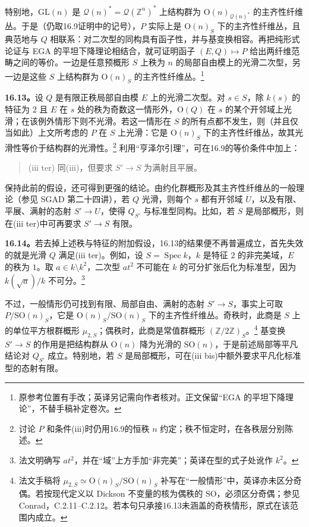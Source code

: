 \documentclass[openany,fontset=fandol]{ctexbook}
\newcommand{\Qsp}{\mathcal Q}
\DeclareMathOperator{\Spec}{Spec}
\begin{document}
特别地，$\mathrm{GL}(n)$ 是 $\Qsp(n)^*=\Qsp(\mathbb Z^n)^*$ 上结构群为 $\mathrm O(n)_{\Qsp(n)^*}$ 的主齐性纤维丛。于是（仍取16.9证明中的记号），$P$ 实际上是 $\mathrm O(n)_S$ 下的主齐性纤维丛，且典范地与 $Q$ 相联系：对二次型的同构具有函子性，并与基变换相容。再把纯形式论证与 EGA 的平坦下降理论相结合，就可证明函子 $(E,Q)\mapsto P$ 给出两纤维范畴之间的等价。一边是任意预概形 $S$ 上秩为 $n$ 的局部自由模上的光滑二次型，另一边是这些 $S$ 上结构群为 $\mathrm O(n)_S$ 的主齐性纤维丛。\footnote{原参考位置有手改；英译另记需向作者核对。正文保留“EGA 的平坦下降理论”，不替手稿补定卷次。}

\medskip
\noindent\textbf{16.13。}\quad 设 $Q$ 是有限正秩局部自由模 $E$ 上的光滑二次型。对 $s\in S$，除 $k(s)$ 的特征为 $2$ 且 $E$ 在 $s$ 处的秩为奇数这一情形外，$\mathrm O(Q)$ 在 $s$ 的某个开邻域上光滑；在该例外情形下则不光滑。若这一情形在 $S$ 的所有点都不发生，则（并且仅当如此）上文所考虑的 $P$ 在 $S$ 上光滑：它是 $\mathrm O(n)_S$ 下的主齐性纤维丛，故其光滑性等价于结构群的光滑性。\footnote{讨论 $P$ 和条件(iii)时仍用16.9的恒秩 $n$ 约定；秩不恒定时，在各秩层分别陈述。}
利用“亨泽尔引理”，可在16.9的等价条件中加上：
\begin{quote}
\textup{(iii ter)} 同(iii)，但要求 $S'\to S$ 为满射且平展。
\end{quote}

保持此前的假设，还可得到更强的结论。由约化群概形及其主齐性纤维丛的一般理论（参见 SGAD 第二十四讲），若 $Q$ 光滑，则每个 $s$ 都有开邻域 $U$，以及有限、平展、满射的态射 $S'\to U$，使得 $Q_{S'}$ 与标准型同构。比如，若 $S$ 是局部概形，则在(iii ter)中可再要求 $S'\to S$ 有限。

\medskip
\newpage
\noindent\textbf{16.14。}\quad 若去掉上述秩与特征的附加假设，16.13的结果便不再普遍成立，首先失效的就是光滑 $Q$ 满足(iii ter)。例如，设 $S=\Spec k$，$k$ 是特征 $2$ 的非完美域，$E$ 的秩为 $1$。取 $a\in k\setminus k^2$，二次型 $at^2$ 不可能在 $k$ 的可分扩张后化为标准型，因为 $k(\sqrt a)/k$ 不可分。\footnote{法文明确写 $at^2$，并在“域”上方手加“非完美”；英译在型的式子处讹作 $k^2$。}

不过，一般情形仍可找到有限、局部自由、满射的态射 $S'\to S$，事实上可取 $P/\mathrm{SO}(n)_S$，它是 $\mathrm O(n)_S/\mathrm{SO}(n)_S$ 下的主齐性纤维丛。奇秩时，此商是 $S$ 上的单位平方根群概形 $\mu_{2,S}$；偶秩时，此商是常值群概形 $(\mathbb Z/2\mathbb Z)_S$。\footnote{法文手稿将 $\mu_{2,S}\simeq\mathrm O(n)_S/\mathrm{SO}(n)_S$ 补写在“一般情形”中，英译亦未区分奇偶。若按现代定义以 Dickson 不变量的核为偶秩的 $\mathrm{SO}$，必须区分奇偶；参见 Conrad，C.2.11--C.2.12。若本句只承接16.13未涵盖的奇秩情形，原式在该范围内成立。}
基变换 $S'\to S$ 的作用是把结构群从 $\mathrm O(n)$ 降为光滑的 $\mathrm{SO}(n)$，于是前述局部等平凡结论对 $Q_{S'}$ 成立。特别地，若 $S$ 是局部概形，可在(iii bis)中额外要求平凡化标准型的态射有限。
\end{document}
